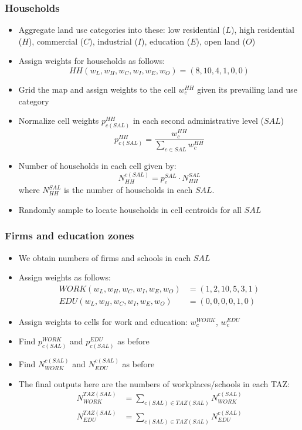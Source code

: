 \documentclass[11pt,twoside]{article}
\numberwithin{equation}{section}
\newcommand{\?}{\stackrel{?}{=}}
\newcommand{\fr}{\frac}
\begin{document}
\subsubsection{Households}
\begin{itemize}
  \item Aggregate land use categories into these: low residential ($L$), high residential ($H$), commercial ($C$), industrial ($I$), education ($E$), open land ($O$)
  \item Assign weights for households as follows:
    \begin{equation}
     HH (w_L, w_H, w_C, w_I, w_E, w_O) = (8, 10, 4, 1, 0, 0)
    \end{equation}
  \item Grid the map and assign weights to the cell $w_c^{HH}$ given its  prevailing land use category
  \item Normalize cell weights $p_{c(SAL)}^{HH}$ in each second administrative level ($SAL$)
    \begin{equation}
      p_{c(SAL)}^{HH} = \fr{w_c^{HH}}{\sum_{c \in SAL} w_c^{HH}}
    \end{equation}
  \item Number of households in each cell given by:
    \begin{equation}
     N_{HH}^{c(SAL)} = p_c^{SAL}\cdot N_{HH}^{SAL}
    \end{equation}
    where $ N_{HH}^{SAL}$ is the number of households in each $SAL$.
  \item Randomly sample to locate households in cell centroids for all $SAL$
  \end{itemize}


\subsubsection{Firms and education zones}
\begin{itemize}
  \item We obtain numbers of firms and schools in each $SAL$
  \item Assign weights as follows:
    \begin{align}
      WORK (w_L, w_H, w_C, w_I, w_E, w_O) &= (1, 2, 10, 5, 3, 1)\\
      EDU (w_L, w_H, w_C, w_I, w_E, w_O) &= (0, 0, 0, 0, 1, 0)
    \end{align}
  \item Assign weights to cells for work and education: $w_c^{WORK}$,  $w_c^{EDU}$
    
  \item Find $p_{c(SAL)}^{WORK}$ and $p_{c(SAL)}^{EDU}$ as before
  \item Find  $N_{WORK}^{c(SAL)}$ and $ N_{EDU}^{c(SAL)}$ as before
  \item The final outputs here are the numbers of workplaces/schools in each TAZ:
    \begin{align}
      N_{WORK}^{TAZ(SAL)} &= \sum_{c(SAL) \in TAZ(SAL)} N_{WORK}^{c(SAL)} \\
      N_{EDU}^{TAZ(SAL)} &= \sum_{c(SAL) \in TAZ(SAL)} N_{EDU}^{c(SAL)}  
    \end{align}
  \end{itemize}
\end{document}
